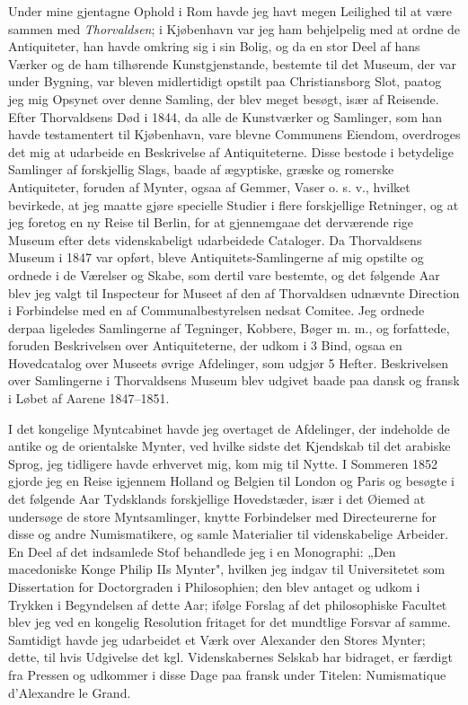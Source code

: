 \documentclass[12pt,a4paper]{article}
\newcommand{\opage}[1]{\marginnote{\footnotesize\textit{[#1]}}}
\begin{document}
Under mine gjentagne Ophold i Rom havde jeg havt megen Leilighed til at være
sammen med \emph{Thorvaldsen}; i Kjøbenhavn var jeg ham behjelpelig med at ordne
de Antiquiteter, han havde omkring sig i sin Bolig, og da en stor Deel af hans
Værker og de ham tilhørende Kunstgjenstande, bestemte til det Museum, der var
under Bygning, var bleven midlertidigt opstilt paa Christiansborg Slot, paatog jeg
mig Opsynet over denne Samling, der blev
\opage{43} meget besøgt, især af Reisende. Efter Thorvaldsens Død i 1844, da alle de
Kunstværker og Samlinger, som han havde testamentert til Kjøbenhavn, vare blevne
Communens Eiendom, overdroges det mig at udarbeide en Beskrivelse af
Antiquiteterne. Disse bestode i betydelige Samlinger af forskjellig Slags, baade
af ægyptiske, græske og romerske Antiquiteter, foruden af Mynter, ogsaa af
Gemmer, Vaser o. s. v., hvilket bevirkede, at jeg maatte gjøre specielle Studier i
flere forskjellige Retninger, og at jeg foretog en ny Reise til Berlin, for at
gjennemgaae det derværende rige Museum efter dets videnskabeligt udarbeidede
Cataloger. Da Thorvaldsens Museum i 1847 var opført, bleve
Antiquitets-Samlingerne af mig opstilte og ordnede i de Værelser og Skabe, som
dertil vare bestemte, og det følgende Aar blev jeg valgt til Inspecteur for
Museet af den af Thorvaldsen udnævnte Direction i Forbindelse med en af
Communalbestyrelsen nedsat Comitee. Jeg ordnede derpaa ligeledes Samlingerne af
Tegninger, Kobbere, Bøger m. m., og forfattede, foruden Beskrivelsen over
Antiquiteterne, der udkom i 3 Bind, ogsaa en Hovedcatalog over Museets øvrige
Afdelinger, som udgjør 5 Hefter. Beskrivelsen over Samlingerne i Thorvaldsens
Museum blev udgivet baade paa dansk og fransk i Løbet af Aarene 1847--1851.

I det kongelige Myntcabinet havde jeg overtaget de Afdelinger, der indeholde de
antike og de orientalske Mynter, ved hvilke sidste det Kjendskab til det arabiske
Sprog, jeg tidligere havde erhvervet mig, kom mig til Nytte. I Sommeren 1852
gjorde jeg en Reise igjennem Holland og Belgien til London og Paris og besøgte i
det følgende Aar Tydsklands forskjellige Hovedstæder, især i det Øiemed at
undersøge de store Myntsamlinger, knytte Forbindelser med Directeurerne for disse
og andre Numismatikere, og samle Materialier til videnskabelige Arbeider. En Deel
af det indsamlede Stof behandlede jeg i en Monographi: „Den macedoniske Konge
Philip IIs Mynter", hvilken jeg indgav til Universitetet som Dissertation for
Doctorgraden i Philosophien; den blev antaget og udkom i Trykken i Begyndelsen af
dette Aar; ifølge Forslag af det philosophiske Facultet blev jeg ved en kongelig
Resolution
\opage{44} fritaget for det mundtlige Forsvar af samme. Samtidigt havde jeg udarbeidet et
Værk over Alexander den Stores Mynter; dette, til hvis Udgivelse det kgl.
Videnskabernes Selskab har bidraget, er færdigt fra Pressen og udkommer i disse
Dage paa fransk under Titelen: Numismatique d'Alexandre le Grand.
\end{document}
